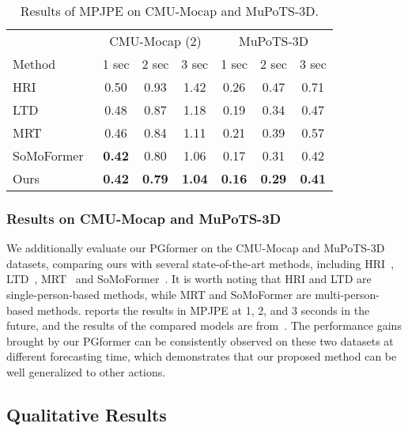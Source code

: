 \documentclass[10pt,twocolumn,letterpaper]{article}
\begin{document}
\begin{table}[t]
    \setlength\tabcolsep{3.5pt}
    \caption{Results of MPJPE on CMU-Mocap and MuPoTS-3D.}
    \vskip -0.1in
    \label{tab:cmu_mup}
    \begin{center}
\small
    \begin{tabular}{l|ccc|ccc}
\hline
        & \multicolumn{3}{c|}{CMU-Mocap (2)} & \multicolumn{3}{c}{MuPoTS-3D} (2--3) \\
\cline{2-7}
        Method & 1 sec & 2 sec & 3 sec & 1 sec & 2 sec &3 sec \\
        \hline
HRI~\cite{mao2020history} & 0.50 & 0.93 & 1.42 & 0.26 & 0.47 & 0.71 \\
        LTD~\cite{mao2019learning} & 0.48 & 0.87 & 1.18 & 0.19 & 0.34 & 0.47 \\
        MRT~\cite{wang2021multiperson} & 0.46 & 0.84 & 1.11 & 0.21 & 0.39 & 0.57 \\
        SoMoFormer~\cite{Vendrow2022SoMoFormer} & \textbf{0.42} & 0.80 & 1.06 & 0.17 & 0.31 & 0.42 \\
        Ours & \textbf{0.42} & \textbf{0.79} & \textbf{1.04} & \textbf{0.16} & \textbf{0.29} & \textbf{0.41} \\
        \hline
\end{tabular}
    \end{center}
    \vskip -0.3in
\end{table}

\subsubsection{Results on CMU-Mocap and MuPoTS-3D}
We additionally evaluate our PGformer on the CMU-Mocap and MuPoTS-3D datasets, comparing ours with several state-of-the-art methods, including HRI~\cite{mao2020history}, LTD~\cite{mao2019learning}, MRT~\cite{wang2021multiperson} and SoMoFormer~\cite{Vendrow2022SoMoFormer}. 
It is worth noting that HRI and LTD are single-person-based methods, while MRT and SoMoFormer are multi-person-based methods. 
 reports the results in MPJPE at 1, 2, and 3 seconds in the future, and the results of the compared models are from~\cite{Vendrow2022SoMoFormer}. 
The performance gains brought by our PGformer can be consistently observed on these two datasets at different forecasting time, 
which demonstrates that our proposed method can be well generalized to other actions.


\subsection{Qualitative Results}
\end{document}
